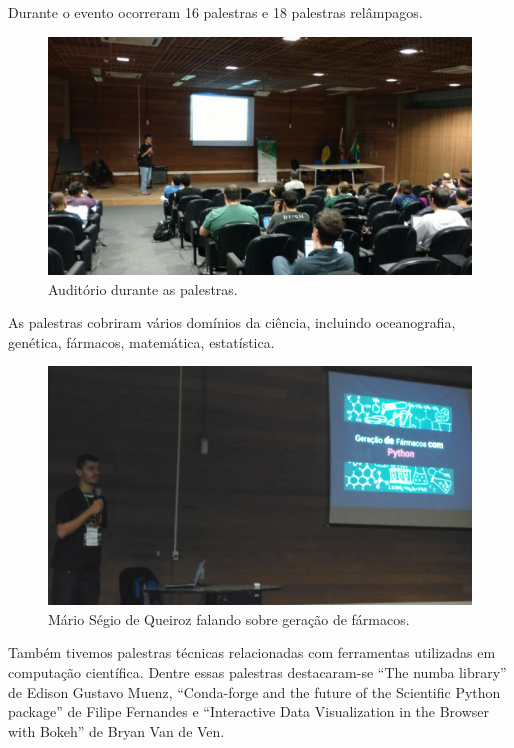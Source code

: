 \documentclass[12pt]{article}
\begin{document}
Durante o evento ocorreram 16 palestras e 18 palestras relâmpagos.

\begin{figure}[!htb]
\center
\includegraphics[height=.3\textheight]{talks-full.jpg}
\caption{Auditório durante as palestras.}
\end{figure}

As palestras cobriram vários domínios da ciência, incluindo
oceanografia,
genética,
fármacos,
matemática,
estatística.

\begin{figure}[!htb]
\center
\includegraphics[height=.3\textheight]{talks-drugs.jpg}
\caption{Mário Ségio de Queiroz falando sobre geração de fármacos.}
\end{figure}

Também tivemos palestras técnicas relacionadas com ferramentas utilizadas em
computação científica. Dentre essas palestras destacaram-se ``The numba
library'' de Edison Gustavo Muenz, ``Conda-forge and the future of the
Scientific Python package'' de Filipe Fernandes e ``Interactive Data
Visualization in the Browser with Bokeh'' de Bryan Van de Ven.
\end{document}
